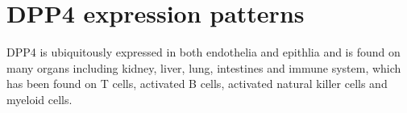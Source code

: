 \section{DPP4 expression patterns}
DPP4 is ubiquitously expressed in both endothelia and epithlia and is found on many organs  including kidney, liver, lung, intestines and immune system, which has been found on T cells, activated B cells, activated natural killer cells and myeloid cells.~\cite{Abbott1994,Shingu2003,Hong1989,Gutschmidt1981,Dikov2004,Bühling1995,Tanaka1992,Gorrell1991}